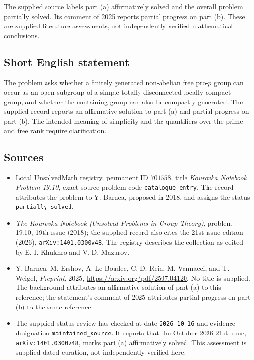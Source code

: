 \documentclass[11pt]{article}
\begin{document}
The supplied source labels part (a) affirmatively solved and the overall problem partially solved. Its comment of 2025 reports partial progress on part (b). These are supplied literature assessments, not independently verified mathematical conclusions.
\subsection{Short English statement}
The problem asks whether a finitely generated non-abelian free pro-\(p\) group can occur as an open subgroup of a simple totally disconnected locally compact group, and whether the containing group can also be compactly generated. The supplied record reports an affirmative solution to part (a) and partial progress on part (b). The intended meaning of simplicity and the quantifiers over the prime and free rank require clarification.
\subsection{Sources}
\begin{itemize}
\item Local UnsolvedMath registry, permanent ID \(701558\), title \emph{Kourovka Notebook Problem 19.10}, exact source problem code \texttt{catalogue entry}. The record attributes the problem to Y. Barnea, proposed in 2018, and assigns the status \texttt{partially\_solved}.
\item \emph{The Kourovka Notebook (Unsolved Problems in Group Theory)}, problem 19.10, 19th issue (2018); the supplied record also cites the 21st issue edition (2026), \texttt{arXiv:1401.0300v48}. The registry describes the collection as edited by E. I. Khukhro and V. D. Mazurov.
\item Y. Barnea, M. Ershov, A. Le Boudec, C. D. Reid, M. Vannacci, and T. Weigel, \emph{Preprint}, 2025, \url{https://arxiv.org/pdf/2507.04120}. No title is supplied. The background attributes an affirmative solution of part (a) to this reference; the statement's comment of 2025 attributes partial progress on part (b) to the same reference.
\item The supplied status review has checked-at date \texttt{2026-10-16} and evidence designation \texttt{maintained\_source}. It reports that the October 2026 21st issue, \texttt{arXiv:1401.0300v48}, marks part (a) affirmatively solved. This assessment is supplied dated curation, not independently verified here.
\end{itemize}
\end{document}
